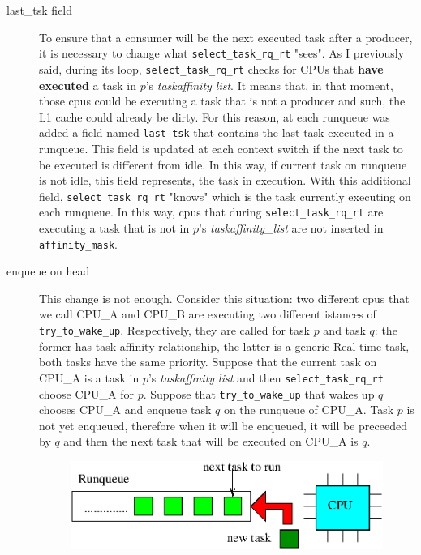 \begin{description}

\item[last\_tsk field] To ensure that a consumer will be the next executed task after a producer, it is necessary to change what 
\texttt{select\_task\_rq\_rt} "sees". As I previously said, during its loop, \texttt{select\_task\_rq\_rt} checks for CPUs that \textbf{have executed} a 
task in $p$'s \textit{taskaffinity list}. It means that, in that moment, those cpus could be executing a task that is not a producer and such, the L1 cache 
could already be dirty. For this reason, at each runqueue was added a field named \texttt{last\_tsk} that contains the last task executed in a runqueue. 
This field is updated at each context switch if the next task to be executed is different from idle. In this way, if current task on runqueue is not idle, 
this field represents, the task in execution. With this additional field, \texttt{select\_task\_rq\_rt} "knows" which is the task currently executing on 
each runqueue. In this way, cpus that during \texttt{select\_task\_rq\_rt} are executing a task that is not in $p$'s \textit{taskaffinity\_list} are not 
inserted in \texttt{affinity\_mask}.

\item[enqueue on head] This change is not enough. Consider this situation: two different cpus that we call CPU\_A and CPU\_B are executing two different 
istances of \texttt{try\_to\_wake\_up}. Respectively, they are called for task $p$ and task $q$: the former has task-affinity relationship, the latter is 
a generic Real-time task, both tasks have the same priority. Suppose that the current task on CPU\_A is a task in $p$'s \textit{taskaffinity list} and then 
\texttt{select\_task\_rq\_rt} choose CPU\_A for $p$. Suppose that \texttt{try\_to\_wake\_up} that wakes up $q$ chooses CPU\_A and enqueue task $q$ on the 
runqueue of CPU\_A. Task $p$ is not yet enqueued, therefore when it will be enqueued, it will be preceeded by $q$ and then the next task that will
be executed on CPU\_A is $q$.

\begin{figure}[htbp]
\centering
\includegraphics[width=\widefigure]{images/enq_head.eps}
\caption{}
\label{fig:enq_head}
\end{figure}


\end{description}
